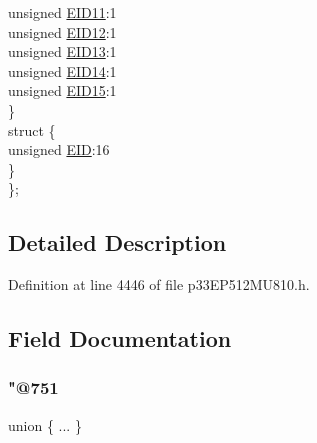\begin{DoxyCompactItemize}
\begin{tabbing}
\>\>unsigned \hyperlink{structtag_c1_r_x_f12_e_i_d_b_i_t_s_a710bdb0d602deb021b0be99066008018}{EID11}:1\\
\>\>unsigned \hyperlink{structtag_c1_r_x_f12_e_i_d_b_i_t_s_aa347bb85867bd8d4e0124f7cff8c6472}{EID12}:1\\
\>\>unsigned \hyperlink{structtag_c1_r_x_f12_e_i_d_b_i_t_s_a37d5f3edcbf6ef62f848fd4f3c584f79}{EID13}:1\\
\>\>unsigned \hyperlink{structtag_c1_r_x_f12_e_i_d_b_i_t_s_a7ffc0b0e0d99b8476b6f9a45337c17ab}{EID14}:1\\
\>\>unsigned \hyperlink{structtag_c1_r_x_f12_e_i_d_b_i_t_s_a293cd7dc1746257fa75a60cbd9383cd7}{EID15}:1\\
\>\} \\
\>struct \{\\
\>\>unsigned \hyperlink{structtag_c1_r_x_f12_e_i_d_b_i_t_s_ae80b378c9141f7c03e0b4e55b5f4b54d}{EID}:16\\
\>\} \\
\}; \\

\end{tabbing}\end{DoxyCompactItemize}


\subsection{Detailed Description}


Definition at line 4446 of file p33\+E\+P512\+M\+U810.\+h.



\subsection{Field Documentation}
\mbox{\label{structtag_c1_r_x_f12_e_i_d_b_i_t_s_ade6d5f1ee159d0a70a07b1b39980dadb}} 
\subsubsection{\texorpdfstring{"@751}{@751}}
{\footnotesize\ttfamily union \{ ... \} }

\mbox{\label{structtag_c1_r_x_f12_e_i_d_b_i_t_s_ae80b378c9141f7c03e0b4e55b5f4b54d}} 
